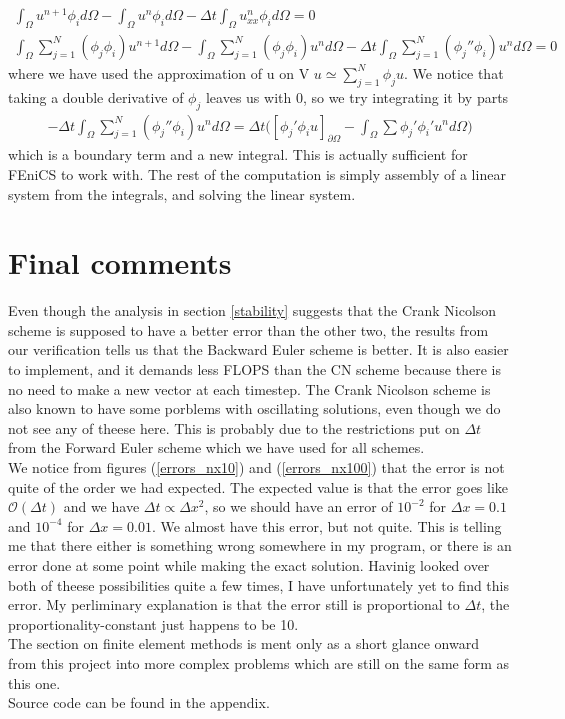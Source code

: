 \documentclass[a4paper,english, 10pt, twoside]{article}
\renewcommand{\d}{\partial}
\begin{document}
\begin{align*}
 \int_\Omega u^{n+1}\phi_id\Omega - \int_\Omega u^{n}\phi_id\Omega -\Delta t \int_\Omega u^{n}_{xx}\phi_id\Omega = 0 \\
 \int_\Omega \sum\limits_{j=1}^N(\phi_j\phi_i)u^{n+1}d\Omega - \int_\Omega \sum\limits_{j=1}^N(\phi_j\phi_i)u^{n}d\Omega -
 \Delta t \int_\Omega \sum\limits_{j=1}^N(\phi_j''\phi_i)u^{n}d\Omega = 0 
\end{align*}
where we have used the approximation of u on V $u\simeq\sum\limits_{j=1}^N\phi_ju$. We notice that taking a double derivative of $\phi_j$ leaves us 
with 0, so we try integrating it by parts
\begin{align*}
 - \Delta t \int_\Omega \sum\limits_{j=1}^N(\phi_j''\phi_i)u^{n}d\Omega = \Delta t\big([\phi_j'\phi_iu]_{\d\Omega} -\int_\Omega \sum 
 \phi_j'\phi_i'u^nd\Omega\big)
\end{align*}
which is a boundary term and a new integral. This is actually sufficient for FEniCS to work with. The rest of the computation is simply assembly of a 
linear system from the integrals, and solving the linear system.

\section{Final comments}
Even though the analysis in section \ref{stability} suggests that the Crank Nicolson scheme is supposed to have a better error than the other two, 
the results from our verification tells us that the Backward Euler scheme is better. It is also easier to implement, and it demands less FLOPS than 
the CN scheme because there is no need to make a new vector at each timestep. The Crank Nicolson scheme is also known to have some porblems with 
oscillating solutions, even though we do not see any of theese here. This is probably due to the restrictions put on $\Delta t$ from the Forward 
Euler scheme which we have used for all schemes.\\
We notice from figures (\ref{errors_nx10}) and (\ref{errors_nx100}) that the error is not quite of the order we had expected. The expected value is 
that the error goes like $\mathcal{O}(\Delta t)$ and we have $\Delta t \propto \Delta x^2$, so we should have an error of $10^{-2}$ for 
$\Delta x = 0.1$ and $10^{-4}$ for $\Delta x = 0.01$. We almost have this error, but not quite. This is telling me that there either is something 
wrong somewhere in my program, or there is an error done at some point while making the exact solution. Havinig looked over both of theese possibilities 
quite a few times, I have unfortunately yet to find this error. My perliminary explanation is that the error still is proportional to 
$\Delta t$, the proportionality-constant just happens to be 10.\\
The section on finite element methods is ment only as a short glance onward from this project into more complex problems which are still on the same 
form as this one. \\
Source code can be found in the appendix.
\end{document}

